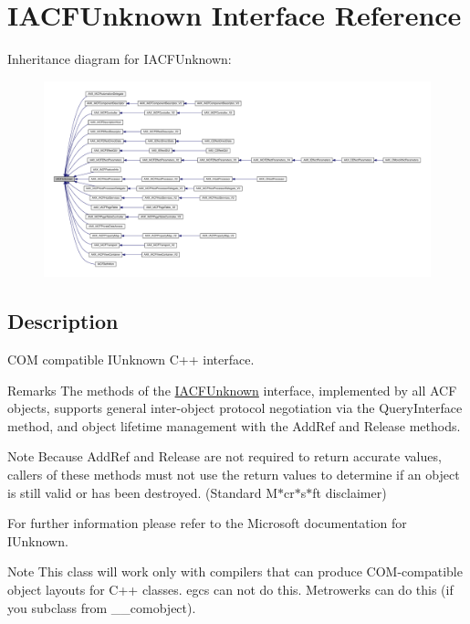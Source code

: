 \hypertarget{a01409}{}\section{I\+A\+C\+F\+Unknown Interface Reference}
\label{a01409}


Inheritance diagram for I\+A\+C\+F\+Unknown\+:
\nopagebreak
\begin{figure}[H]
\begin{center}
\leavevmode
\includegraphics[width=350pt]{a01408}
\end{center}
\end{figure}


\subsection{Description}
C\+OM compatible I\+Unknown C++ interface. 

\begin{DoxyRemark}{Remarks}
The methods of the \mbox{\hyperlink{a01409}{I\+A\+C\+F\+Unknown}} interface, implemented by all A\+CF objects, supports general inter-\/object protocol negotiation via the {\ttfamily Query\+Interface} method, and object lifetime management with the Add\+Ref and Release methods.
\end{DoxyRemark}
\begin{DoxyNote}{Note}
Because Add\+Ref and Release are not required to return accurate values, callers of these methods must not use the return values to determine if an object is still valid or has been destroyed. (Standard M$\ast$cr$\ast$s$\ast$ft disclaimer)
\end{DoxyNote}
For further information please refer to the Microsoft documentation for I\+Unknown.

\begin{DoxyNote}{Note}
This class will work only with compilers that can produce C\+O\+M-\/compatible object layouts for C++ classes. egcs can not do this. Metrowerks can do this (if you subclass from \+\_\+\+\_\+comobject). 
\end{DoxyNote}
